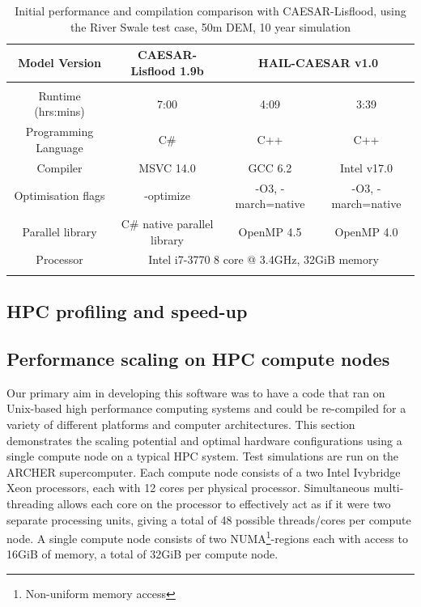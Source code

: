 \begin{table}


\resizebox{\textwidth}{!}
{%
\begin{tabular}{cccc}
Model Version & \textbf{CAESAR-Lisflood 1.9b} & \multicolumn{2}{c}{\textbf{HAIL-CAESAR v1.0}} \\
\hline \\
Runtime (hrs:mins) & 7:00 & 4:09 & 3:39 \\
Programming Language & C\# & C++ & C++ \\
Compiler & MSVC 14.0 & GCC 6.2 & Intel v17.0 \\
Optimisation flags & -optimize & -O3, -march=native & -O3, -march=native \\
Parallel library & C\# native parallel library & OpenMP 4.5 & OpenMP 4.0 \\
Processor & \multicolumn{3}{c}{Intel i7-3770 8 core @ 3.4GHz, 32GiB memory} \\
\hline \\
\end{tabular} 
}
\caption{Initial performance and compilation comparison with CAESAR-Lisflood, using the River Swale test case, 50m DEM, 10 year simulation} 
\label{versus_CL}
\end{table}

\subsection{HPC profiling and speed-up}

\subsection{Performance scaling on HPC compute nodes}
Our primary aim in developing this software was to have a code that ran on Unix-based high performance computing systems and could be re-compiled for a variety of different platforms and computer architectures. This section demonstrates the scaling potential and optimal hardware configurations using a single compute node on a typical HPC system. Test simulations are run on the ARCHER supercomputer. Each compute node consists of a two Intel Ivybridge Xeon processors, each with 12 cores per physical processor. Simultaneous multi-threading allows each core on the processor to effectively act as if it were two separate processing units, giving a total of 48 possible threads/cores per compute node. A single compute node consists of two NUMA\footnote{Non-uniform memory access}-regions each with access to 16GiB of memory, a total of 32GiB per compute node. 

